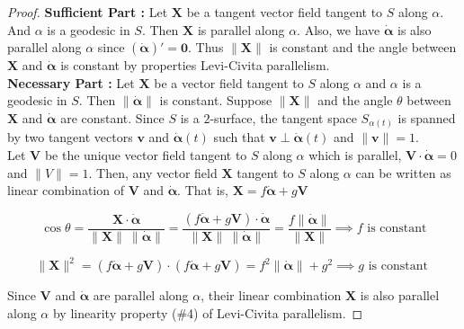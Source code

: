 \begin{proof}
	\textbf{Sufficient Part : }
	Let $\boldsymbol{X}$ be a tangent vector field tangent to $S$ along $\alpha$.
	And $\alpha$ is a geodesic in $S$.
	Then $\boldsymbol{X}$ is parallel along $\alpha$.
	Also, we have $\dot{\boldsymbol{\alpha}}$ is also parallel along $\alpha$ since $(\dot{\boldsymbol{\alpha}})' = \boldsymbol{0}$.
	Thus $\|\boldsymbol{X}\|$ is constant and the angle between $\boldsymbol{X}$ and $\dot{\boldsymbol{\alpha}}$ is constant by properties Levi-Civita parallelism.\\


	\textbf{Necessary Part : }
	Let $\boldsymbol{X}$ be a vector field tangent to $S$ along $\alpha$ and $\alpha$ is a geodesic in $S$.
	Then $\|\dot{\boldsymbol{\alpha}}\|$ is constant.
	Suppose $\|\boldsymbol{X}\|$ and the angle $\theta$ between $\boldsymbol{X}$ and $\dot{\boldsymbol{\alpha}}$ are constant.
	Since $S$ is a $2$-surface, the tangent space $S_{\alpha(t)}$ is spanned by two tangent vectors $\boldsymbol{v}$ and $\dot{\boldsymbol{\alpha}}(t)$ such that $\boldsymbol{v} \perp \dot{\boldsymbol{\alpha}}(t)$ and $\|\boldsymbol{v}\| = 1$.\\

	
	Let $\boldsymbol{V}$ be the unique vector field tangent to $S$ along $\alpha$ which is parallel, $\boldsymbol{V} \cdot \dot{\boldsymbol{\alpha}} = 0$ and $\|V\| = 1$.
	Then, any vector field $\boldsymbol{X}$ tangent to $S$ along $\alpha$ can be written as linear combination of $\boldsymbol{V}$ and $\dot{\boldsymbol{\alpha}}$.
	That is, $\boldsymbol{X} = f\dot{\boldsymbol{\alpha}} + g\boldsymbol{V}$

	$$ \cos \theta = \frac{\boldsymbol{X} \cdot \dot{\boldsymbol{\alpha}}}{\| \boldsymbol{X}\|\ \|\dot{\boldsymbol{\alpha}}\|} = \frac{(f\dot{\boldsymbol{\alpha}}+g\boldsymbol{V}) \cdot \dot{\boldsymbol{\alpha}}}{\|\boldsymbol{X}\|\ \|\dot{\boldsymbol{\alpha}}\|} = \frac{f \|\dot{\boldsymbol{\alpha}}\|}{\|\boldsymbol{X}\|} \implies f \text{ is constant}$$ 

	\[ \|\boldsymbol{X}\|^2 = (f\dot{\boldsymbol{\alpha}}+g\boldsymbol{V}) \cdot (f\dot{\boldsymbol{\alpha}}+g\boldsymbol{V}) = f^2\|\dot{\boldsymbol{\alpha}} \| + g^2 \implies g \text{ is constant } \]

	Since $\boldsymbol{V}$ and $\dot{\boldsymbol{\alpha}}$ are parallel along $\alpha$, their linear combination $\boldsymbol{X}$ is also parallel along $\alpha$ by linearity property (\#4) of Levi-Civita parallelism.
\end{proof}

